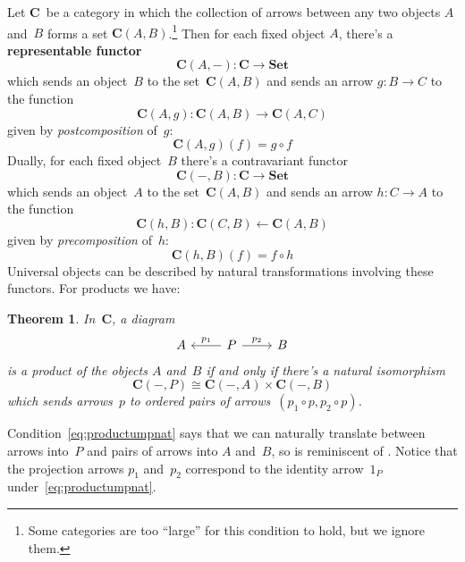 \documentclass[letterpaper,12pt]{article}
\newcommand{\from}{\leftarrow}
\newcommand{\iso}{\cong}
\newcommand{\after}{\circ}
\newcommand{\cat}[1]{\mathbf{#1}}
\newcommand{\Set}{\cat{Set}}
\newcommand{\textdefn}{\textbf}
\theoremstyle{definition}
\theoremstyle{plain}
\newtheorem{thm}[equation]{Theorem}
\numberwithin{equation}{section}
\begin{document}
Let \(\cat{C}\)~be a category in which the collection of arrows between any two objects \(A\) and~\(B\) forms a set \(\cat{C}(A,B)\).\footnote{Some categories are too ``large'' for this condition to hold, but we ignore them.} Then for each fixed object \(A\), there's a \textdefn{representable functor}
\begin{equation}
\cat{C}(A,-):\cat{C}\to\Set
\end{equation}
which sends an object~\(B\) to the set~\(\cat{C}(A,B)\) and sends an arrow \(g:B\to C\) to the function
\[\cat{C}(A,g):\cat{C}(A,B)\to\cat{C}(A,C)\]
given by \emph{postcomposition} of~\(g\):
\[\cat{C}(A,g)(f)=g\after f\]
Dually, for each fixed object~\(B\) there's a contravariant functor
\begin{equation}
\cat{C}(-,B):\cat{C}\to\Set
\end{equation}
which sends an object~\(A\) to the set~\(\cat{C}(A,B)\) and sends an arrow \(h:C\to A\) to the function
\[\cat{C}(h,B):\cat{C}(C,B)\from\cat{C}(A,B)\]
given by \emph{precomposition} of~\(h\):
\[\cat{C}(h,B)(f)=f\after h\]
Universal objects can be described by natural transformations involving these functors. For products we have:
\begin{thm}
In~\(\cat{C}\), a diagram
\begin{equation*}
\begin{tikzcd}
A & \ar[l,"p_1"'] P \ar[r,"p_2"] & B
\end{tikzcd}
\end{equation*}
is a product of the objects \(A\) and~\(B\) if and only if there's a natural isomorphism
\begin{equation}
\cat{C}(-,P)\iso\cat{C}(-,A)\times\cat{C}(-,B)
\label{eq:productumpnat}
\end{equation}
which sends arrows~\(p\) to ordered pairs of arrows~\((p_1\after p,p_2\after p)\).
\label{thm:productumpnat}
\end{thm}
\noindent Condition~\eqref{eq:productumpnat} says that we can naturally translate between arrows into~\(P\) and pairs of arrows into \(A\) and~\(B\), so  is reminiscent of . Notice that the projection arrows \(p_1\) and~\(p_2\) correspond to the identity arrow~\(1_P\) under~\eqref{eq:productumpnat}.
\end{document}
